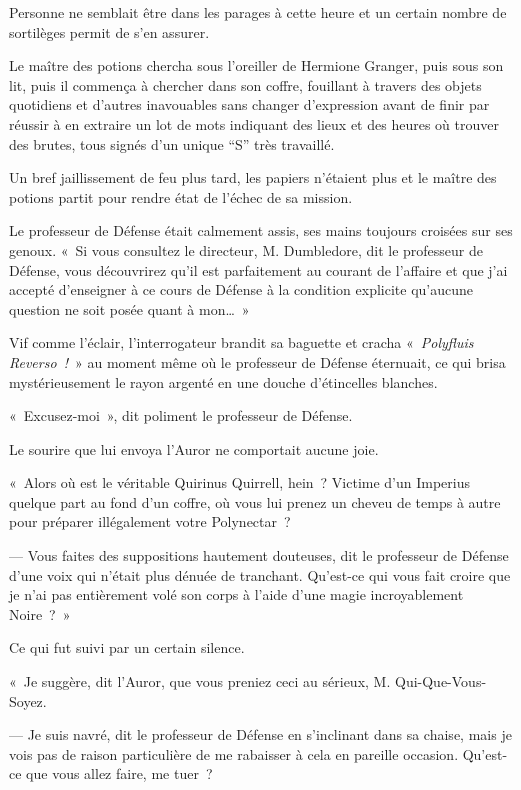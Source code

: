 Personne ne semblait être dans les parages à cette heure et un certain nombre de sortilèges permit de s'en assurer.

Le maître des potions chercha sous l'oreiller de Hermione Granger, puis sous son lit, puis il commença à chercher dans son coffre, fouillant à travers des objets quotidiens et d'autres inavouables sans changer d'expression avant de finir par réussir à en extraire un lot de mots indiquant des lieux et des heures où trouver des brutes, tous signés d'un unique “S” très travaillé.

Un bref jaillissement de feu plus tard, les papiers n'étaient plus et le maître des potions partit pour rendre état de l'échec de sa mission.

\later

Le professeur de Défense était calmement assis, ses mains toujours croisées sur ses genoux.
«~Si vous consultez le directeur, M. Dumbledore, dit le professeur de Défense, vous découvrirez qu'il est parfaitement au courant de l'affaire et que j'ai accepté d'enseigner à ce cours de Défense à la condition explicite qu'aucune question ne soit posée quant à mon…~»

Vif comme l'éclair, l'interrogateur brandit sa baguette et cracha «~\emph{Polyfluis Reverso~!}~» au moment même où le professeur de Défense éternuait, ce qui brisa mystérieusement le rayon argenté en une douche d'étincelles blanches.

«~Excusez-moi~», dit poliment le professeur de Défense.

Le sourire que lui envoya l'Auror ne comportait aucune joie.

«~Alors où est le véritable Quirinus Quirrell, hein~?
Victime d'un Imperius quelque part au fond d'un coffre, où vous lui prenez un cheveu de temps à autre pour préparer illégalement votre Polynectar~?

--- Vous faites des suppositions hautement douteuses, dit le professeur de Défense d'une voix qui n'était plus dénuée de tranchant.
Qu'est-ce qui vous fait croire que je n'ai pas entièrement volé son corps à l'aide d'une magie incroyablement Noire~?~»

Ce qui fut suivi par un certain silence.

«~Je suggère, dit l'Auror, que vous preniez ceci au sérieux, M. Qui-Que-Vous-Soyez.

--- Je suis navré, dit le professeur de Défense en s'inclinant dans sa chaise, mais je vois pas de raison particulière de me rabaisser à cela en pareille occasion.
Qu'est-ce que vous allez faire, me tuer~?

